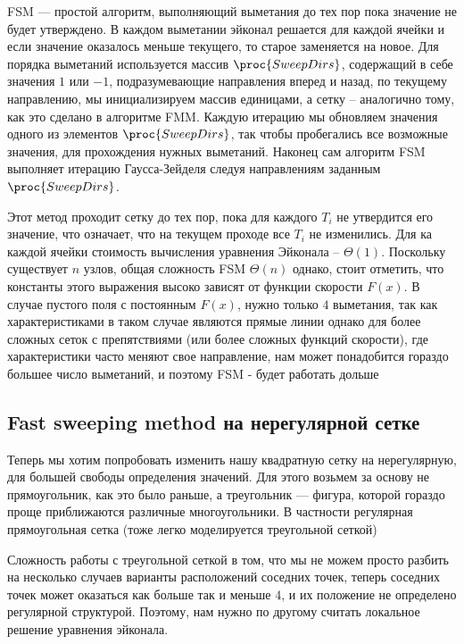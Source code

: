 FSM --- простой алгоритм, выполняющий выметания до тех пор пока
значение не будет утверждено. В каждом выметании эйконал решается для
каждой ячейки и если значение оказалось меньше текущего, то старое
заменяется на новое. Для порядка выметаний используется массив
$\proc{SweepDirs}$, содержащий в себе значения $1$ или $-1$,
подразумевающие направления вперед и назад, по текущему направлению,
мы инициализируем массив единицами, а сетку -- аналогично тому, как
это сделано в алгоритме FMM. Каждую итерацию мы обновляем значения
одного из элементов $\proc{SweepDirs}$, так чтобы пробегались все
возможные значения, для прохождения нужных выметаний. Наконец сам
алгоритм FSM выполняет итерацию Гаусса-Зейделя следуя направлениям
заданным $\proc{SweepDirs}$.

Этот метод проходит сетку до тех пор, пока для каждого $T_i$ не
утвердится его значение, что означает, что на текущем проходе все $T_i$ не
изменились. Для ка каждой ячейки стоимость вычисления уравнения
Эйконала -- $\Theta(1)$. Поскольку существует $n$ узлов, общая
сложность FSM $\Theta(n)$ однако, стоит отметить, что константы этого
выражения высоко зависят от функции скорости $F(x)$. В случае пустого
поля с постоянным $F(x)$, нужно только $4$ выметания, так как
характеристиками в таком случае являются прямые линии однако для более
сложных сеток с препятствиями (или более сложных функций скорости),
где характеристики часто меняют свое направление, нам может
понадобится гораздо большее число выметаний, и поэтому FSM - будет
работать дольше

\subsection{Fast sweeping method на нерегулярной сетке}
\label{sec:unstructured-mesh}

Теперь мы хотим попробовать изменить нашу квадратную сетку на
нерегулярную, для большей свободы определения значений. Для этого
возьмем за основу не прямоугольник, как это было раньше, а треугольник
--- фигура, которой гораздо проще приближаются различные
многоугольники. В частности регулярная прямоугольная сетка (тоже легко
моделируется треугольной сеткой)

Сложность работы с треугольной сеткой в том, что мы не можем просто
разбить на несколько случаев варианты расположений соседних точек,
теперь соседних точек может оказаться как больше так и меньше $4$, и
их положение не определено регулярной структурой. Поэтому, нам нужно
по другому считать локальное решение уравнения эйконала.

